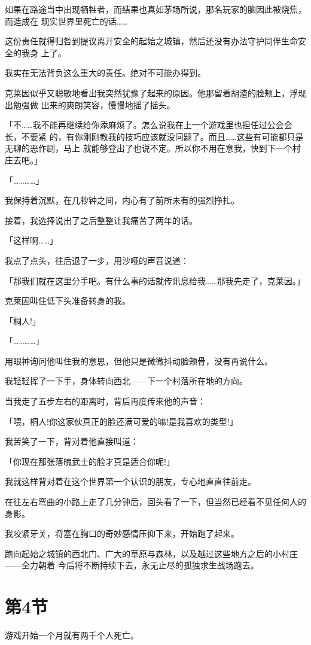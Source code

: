 \documentclass[11pt]{book}
\begin{document}
如果在路途当中出现牺牲者，而结果也真如茅场所说，那名玩家的脑因此被烧焦，而造成在
现实世界里死亡的话……

这份责任就得归咎到提议离开安全的起始之城镇，然后还没有办法守护同伴生命安全的我身
上了。

我实在无法背负这么重大的责任。绝对不可能办得到。

克莱因似乎又聪敏地看出我突然犹豫了起来的原因。他那留着胡渣的脸颊上，浮现出勉强做
出来的爽朗笑容，慢慢地摇了摇头。

「不……我不能再继续给你添麻烦了。怎么说我在上一个游戏里也担任过公会会长，不要紧
的，有你刚刚教我的技巧应该就没问题了。而且……这些有可能都只是无聊的恶作剧，马上
就能够登出了也说不定。所以你不用在意我，快到下一个村庄去吧。」

「…………」

我保持着沉默，在几秒钟之间，内心有了前所未有的强烈挣扎。

接着，我选择说出了之后整整让我痛苦了两年的话。

「这样啊……」

我点了点头，往后退了一步，用沙哑的声音说道：

「那我们就在这里分手吧。有什么事的话就传讯息给我……那我先走了，克莱因。」

克莱因叫住低下头准备转身的我。

「桐人!」

「…………」

用眼神询问他叫住我的意思，但他只是微微抖动脸颊骨，没有再说什么。

我轻轻挥了一下手，身体转向西北——下一个村落所在地的方向。

当我走了五步左右的距离时，背后再度传来他的声音：

「喂，桐人!你这家伙真正的脸还满可爱的嘛!是我喜欢的类型!」

我苦笑了一下，背对着他直接叫道：

「你现在那张落魄武士的脸才真是适合你呢!」

我就这样背对着在这个世界第一个认识的朋友，专心地直直往前走。

在往左右弯曲的小路上走了几分钟后，回头看了一下，但当然已经看不见任何人的身影。

我咬紧牙关，将塞在胸口的奇妙感情压抑下来，开始跑了起来。

跑向起始之城镇的西北门、广大的草原与森林，以及越过这些地方之后的小村庄——全力朝着
今后将不断持续下去，永无止尽的孤独求生战场跑去。
\section{第4节}
\label{sec:org63cd173}
游戏开始一个月就有两千个人死亡。
\end{document}
